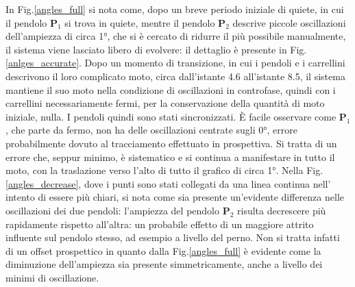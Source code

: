 \documentclass[11pt, a4paper, twoside]{article}
\begin{document}
In Fig.\ref{angles_full} si nota come, dopo un breve periodo iniziale di quiete, in cui il
pendolo $\mathbf{P}_1$ si trova in quiete, mentre il pendolo $\mathbf{P}_2$ descrive piccole
oscillazioni dell'ampiezza di circa 1°, che si è cercato di ridurre il più possibile manualmente,
il sistema viene lasciato libero di evolvere: il dettaglio è presente in Fig.\ref{anlges_accurate}.
Dopo un momento di transizione, in cui i pendoli e i carrellini descrivono il loro complicato moto,
circa dall'istante 4.6 all'istante 8.5, il sistema mantiene il suo moto nella condizione di
oscillazioni in controfase, quindi con i carrellini necessariamente fermi, per la conservazione
della quantità di moto iniziale, nulla. I pendoli quindi sono stati sincronizzati.
È facile osservare come $\mathbf{P}_1$, che parte da fermo, non ha delle oscillazioni
centrate sugli 0°, errore probabilmente dovuto al tracciamento effettuato in prospettiva.
Si tratta di un errore che, seppur minimo, è sistematico e si continua a manifestare in tutto il moto, 
con la traslazione verso l'alto di tutto il grafico di circa 1°.
Nella Fig.\ref{angles_decrease}, dove i punti sono stati collegati da una linea continua nell'
intento di essere più chiari, si nota come sia presente un'evidente differenza nelle oscillazioni 
dei due pendoli: l'ampiezza del pendolo $\mathbf{P}_2$ risulta decrescere più rapidamente rispetto
all'altra: un probabile effetto di un maggiore attrito influente sul pendolo stesso, ad esempio
a livello del perno. Non si tratta infatti di un offset prospettico in quanto dalla Fig.\ref{angles_full}
è evidente come la diminuzione dell'ampiezza sia presente simmetricamente, anche a livello dei
minimi di oscillazione.
\end{document}
